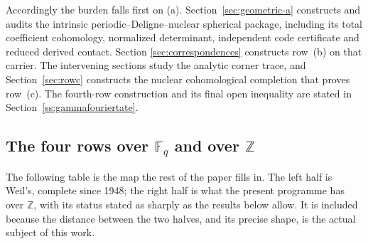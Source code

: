\documentclass[11pt]{amsart}
\theoremstyle{definition}
\theoremstyle{remark}
\newcommand{\Z}{\mathbb Z}
\begin{document}
Accordingly the burden falls first on (a).  Section~\ref{sec:geometric-a}
constructs and audits the intrinsic periodic--Deligne--nuclear spherical
package, including its total coefficient cohomology, normalized determinant,
independent code certificate and reduced derived contact.
Section
\ref{sec:correspondences} constructs row~(b) on that carrier.  The
intervening sections study the analytic corner trace, and
Section~\ref{sec:rowc} constructs the nuclear cohomological completion that
proves row~(c).  The fourth-row construction and its final open inequality are stated in
Section~\ref{ss:gammafouriertate}.

\subsection{The four rows over $\mathbb F_q$ and over $\Z$}
\label{ss:map}

The following table is the map the rest of the paper fills in.  The left
half is Weil's, complete since 1948; the right half is what the present
programme has over $\Z$, with its status stated as sharply as the results
below allow.  It is included because the distance between the two halves,
and its precise shape, is the actual subject of this work.
\end{document}
